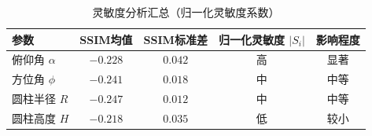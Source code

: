 \begin{table}[H]
\centering
\caption{灵敏度分析汇总（归一化灵敏度系数）}\label{tab:sensitivity}
\begin{tabular}{lcccc}
\toprule
参数 & SSIM均值 & SSIM标准差 & 归一化灵敏度 $|S_i|$ & 影响程度\\
\midrule
俯仰角 $\alpha$ & $-0.228$ & $0.042$ & 高 & 显著\\
方位角 $\phi$   & $-0.241$ & $0.018$ & 中 & 中等\\
圆柱半径 $R$    & $-0.247$ & $0.012$ & 中 & 中等\\
圆柱高度 $H$    & $-0.218$ & $0.035$ & 低 & 较小\\
\bottomrule
\end{tabular}
\end{table}
